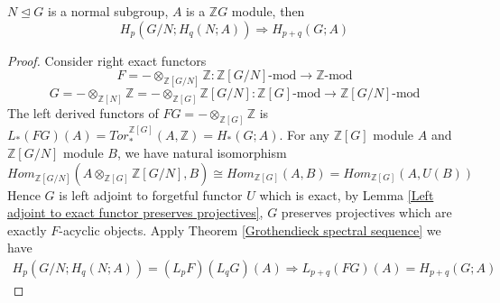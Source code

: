 \documentclass[../main.tex]{subfiles}
\begin{document}
\begin{corollary}\label{Hochschild-Serre spectral sequence}
$N\trianglelefteq G$ is a normal subgroup, $A$ is a $\mathbb ZG$ module, then
\[H_p(G/N;H_q(N;A))\Rightarrow H_{p+q}(G;A)\]
\end{corollary}

\begin{proof}
Consider right exact functors
\[F=-\otimes_{\mathbb Z[G/N]}\mathbb Z:\mathbb Z[G/N]\text{-mod}\to\mathbb Z\text{-mod}\]
\[G=-\otimes_{\mathbb Z[N]}\mathbb Z=-\otimes_{\mathbb Z[G]}\mathbb Z[G/N]:\mathbb Z[G]\text{-mod}\to\mathbb Z[G/N]\text{-mod}\]
The left derived functors of $FG=-\otimes_{\mathbb Z[G]}\mathbb Z$ is $L_*(FG)(A)=Tor_*^{\mathbb Z[G]}(A,\mathbb Z)=H_*(G;A)$. For any $\mathbb Z[G]$ module $A$ and $\mathbb Z[G/N]$ module $B$, we have natural isomorphism
\[Hom_{\mathbb Z[G/N]}(A\otimes_{\mathbb Z[G]}\mathbb Z[G/N],B)\cong Hom_{\mathbb Z[G]}(A,B)=Hom_{\mathbb Z[G]}(A,U(B))\]
Hence $G$ is left adjoint to forgetful functor $U$ which is exact, by Lemma \ref{Left adjoint to exact functor preserves projectives}, $G$ preserves projectives which are exactly $F$-acyclic objects. Apply Theorem \ref{Grothendieck spectral sequence} we have
\begin{align*}
H_p(G/N;H_q(N;A))=(L_pF)(L_qG)(A)\Rightarrow L_{p+q}(FG)(A)=H_{p+q}(G;A)
\end{align*}
\end{proof}
\end{document}
